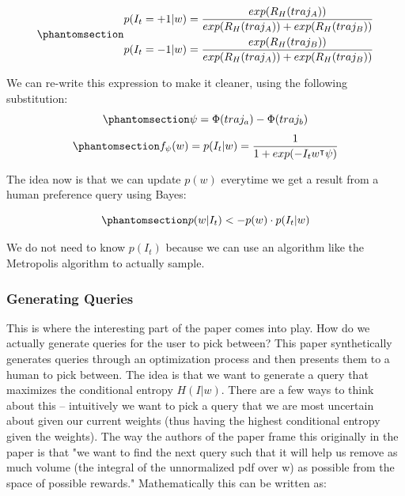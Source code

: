 \documentclass[
  letterpaper,
  numbers=noenddot,
  DIV=11]{scrreprt}
\theoremstyle{definition}
\theoremstyle{plain}
\theoremstyle{plain}
\theoremstyle{remark}
\begin{document}
\begin{equation}\phantomsection\label{eq-eq3.37}{\begin{aligned}
p(I_t = +1|w) &= \frac{exp(R_H(traj_A))}{exp(R_H(traj_A)) + exp(R_H(traj_B))}\\
p(I_t = -1|w) &= \frac{exp(R_H(traj_B))}{exp(R_H(traj_A)) + exp(R_H(traj_B))}
\end{aligned}}\end{equation}

We can re-write this expression to make it cleaner, using the following
substitution:
\begin{equation}\phantomsection\label{eq-eq3.38}{\psi = \Phi(traj_a) - \Phi(traj_b)}\end{equation}
\begin{equation}\phantomsection\label{eq-eq3.39}{f_{\psi} (w) = p(I_t|w) = \frac{1}{1 + exp(-I_tw^{\intercal}\psi)}}\end{equation}

The idea now is that we can update \(p(w)\) everytime we get a result
from a human preference query using Bayes:

\begin{equation}\phantomsection\label{eq-eq3.40}{p(w|I_t) <- p(w) \cdot p(I_t|w)}\end{equation}

We do not need to know \(p(I_t)\) because we can use an algorithm like
the Metropolis algorithm to actually sample.

\subsubsection*{Generating Queries}\label{generating-queries}

This is where the interesting part of the paper comes into play. How do
we actually generate queries for the user to pick between? This paper
synthetically generates queries through an optimization process and then
presents them to a human to pick between. The idea is that we want to
generate a query that maximizes the conditional entropy \(H(I|w)\).
There are a few ways to think about this -- intuitively we want to pick
a query that we are most uncertain about given our current weights (thus
having the highest conditional entropy given the weights). The way the
authors of the paper frame this originally in the paper is that "we want
to find the next query such that it will help us remove as much volume
(the integral of the unnormalized pdf over w) as possible from the space
of possible rewards." Mathematically this can be written as:
\end{document}
